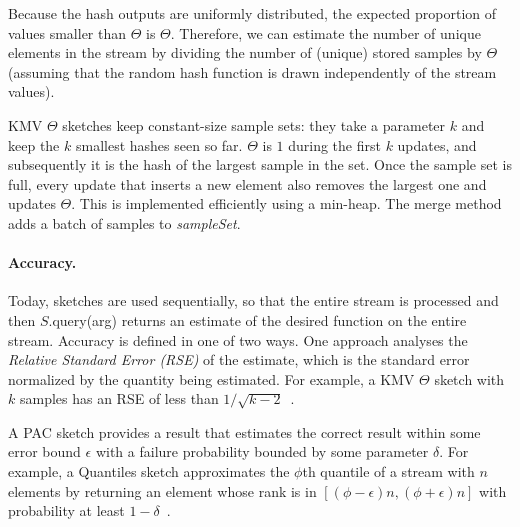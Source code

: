 Because the hash outputs are uniformly distributed, the expected proportion of values
smaller than $\Theta$ is $\Theta$. 
Therefore, we can estimate the number of unique elements in the stream by
dividing the number of (unique) stored samples by $\Theta$ (assuming that the random hash function is
drawn independently of the stream values).

KMV $\Theta$ sketches keep constant-size sample sets:
they take a parameter $k$ and keep the $k$ smallest hashes seen so far. 
$\Theta$ is $1$ during the first $k$ updates, and 
subsequently it is the hash of the largest sample in the set.
Once the sample set is full,
every update that inserts  a new element also removes the largest
one and updates $\Theta$. This is implemented efficiently using a min-heap.
The merge method adds a batch of samples to \emph{sampleSet}.

\paragraph{Accuracy.}

Today, sketches are used sequentially,
so that the entire stream is processed 
and then $S$.query(arg) returns an estimate of the desired function 
on the entire stream. Accuracy is defined in one of two ways.
One approach analyses the \emph{Relative Standard Error (RSE)} of the estimate, 
which is the standard error normalized by the quantity being estimated.
For example, a KMV $\Theta$ sketch with $k$ samples has an RSE of less than $1/\sqrt{k-2}$~\cite{KMV}.

 A PAC sketch provides a result that estimates the correct result
within some error bound $\epsilon$ with a failure probability bounded by some parameter $\delta$.  
For example, a Quantiles sketch approximates the $\phi$th quantile of a stream with $n$ elements 
by returning an element whose rank is in $\left[(\phi-\epsilon)n , (\phi+\epsilon)n \right]$ with 
probability at least $1-\delta$~\cite{agarwal2013mergeable}.